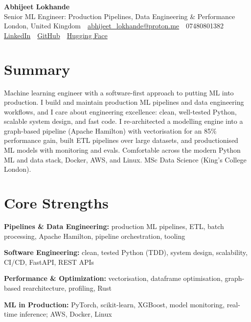 \documentclass[10pt,a4paper]{article}
\newcommand{\sep}{\,\textcolor{accent!60}{\textbar}\,}
\begin{document}
\begin{center}
  {\fontsize{24}{26}\selectfont\bfseries Abhijeet Lokhande}\\[3pt]
  {\color{accent}\large Senior ML Engineer: Production Pipelines, Data Engineering \& Performance}\\[5pt]
  {\small
    London, United Kingdom \sep
    \href{mailto:abhijeet_lokhande@proton.me}{abhijeet\_lokhande@proton.me} \sep
    07480801382 \\[2pt]
    \href{https://www.linkedin.com/in/ablds/}{LinkedIn} \sep
    \href{https://github.com/abhijeetscode}{GitHub} \sep
    \href{https://huggingface.co/ab-ai}{Hugging Face}
  }
\end{center}
\vspace{2pt}

\section{Summary}
Machine learning engineer with a software-first approach to putting ML into production. I build and maintain production ML pipelines and data engineering workflows, and I care about engineering excellence: clean, well-tested Python, scalable system design, and fast code. I re-architected a modelling engine into a graph-based pipeline (Apache Hamilton) with vectorisation for an 85\% performance gain, built ETL pipelines over large datasets, and productionised ML models with monitoring and evals. Comfortable across the modern Python ML and data stack, Docker, AWS, and Linux. MSc Data Science (King's College London).

\section{Core Strengths}
\begin{tight}
  \item[\textcolor{accent}{\small$\bullet$}] \textbf{Pipelines \& Data Engineering:} production ML pipelines, ETL, batch processing, Apache Hamilton, pipeline orchestration, tooling
  \item[\textcolor{accent}{\small$\bullet$}] \textbf{Software Engineering:} clean, tested Python (TDD), system design, scalability, CI/CD, FastAPI, REST APIs
  \item[\textcolor{accent}{\small$\bullet$}] \textbf{Performance \& Optimization:} vectorisation, dataframe optimisation, graph-based rearchitecture, profiling, Rust
  \item[\textcolor{accent}{\small$\bullet$}] \textbf{ML in Production:} PyTorch, scikit-learn, XGBoost, model monitoring, real-time inference; AWS, Docker, Linux
\end{tight}
\end{document}
